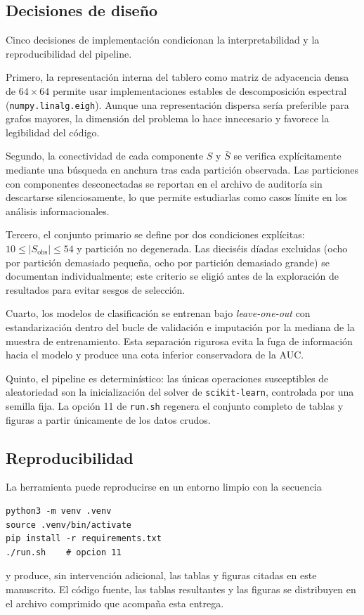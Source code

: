 \documentclass[journal]{IEEEtran}
\newcommand{\Sobs}{S_{\mathrm{obs}}}
\begin{document}
\subsection{Decisiones de diseño}

Cinco decisiones de implementación condicionan la interpretabilidad y la reproducibilidad del pipeline.

Primero, la representación interna del tablero como matriz de adyacencia densa de $64\times 64$ permite usar implementaciones estables de descomposición espectral (\texttt{numpy.linalg.eigh}). Aunque una representación dispersa sería preferible para grafos mayores, la dimensión del problema lo hace innecesario y favorece la legibilidad del código.

Segundo, la conectividad de cada componente $S$ y $\bar S$ se verifica explícitamente mediante una búsqueda en anchura tras cada partición observada. Las particiones con componentes desconectadas se reportan en el archivo de auditoría sin descartarse silenciosamente, lo que permite estudiarlas como casos límite en los análisis informacionales.

Tercero, el conjunto primario se define por dos condiciones explícitas: $10 \le |\Sobs| \le 54$ y partición no degenerada. Las dieciséis díadas excluidas (ocho por partición demasiado pequeña, ocho por partición demasiado grande) se documentan individualmente; este criterio se eligió antes de la exploración de resultados para evitar sesgos de selección.

Cuarto, los modelos de clasificación se entrenan bajo \emph{leave-one-out} con estandarización dentro del bucle de validación e imputación por la mediana de la muestra de entrenamiento. Esta separación rigurosa evita la fuga de información hacia el modelo y produce una cota inferior conservadora de la AUC.

Quinto, el pipeline es determinístico: las únicas operaciones susceptibles de aleatoriedad son la inicialización del solver de \texttt{scikit-learn}, controlada por una semilla fija. La opción 11 de \texttt{run.sh} regenera el conjunto completo de tablas y figuras a partir únicamente de los datos crudos.

\subsection{Reproducibilidad}

La herramienta puede reproducirse en un entorno limpio con la secuencia
\begin{verbatim}
python3 -m venv .venv
source .venv/bin/activate
pip install -r requirements.txt
./run.sh    # opcion 11
\end{verbatim}
y produce, sin intervención adicional, las tablas y figuras citadas en este manuscrito. El código fuente, las tablas resultantes y las figuras se distribuyen en el archivo comprimido que acompaña esta entrega.
\end{document}
